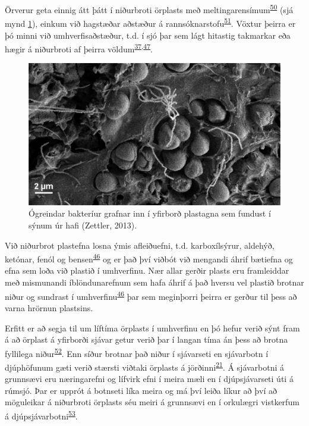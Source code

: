 \documentclass[icelandic,]{book}
\begin{document}
Örverur geta einnig átt þátt í niðurbroti örplasts með meltingarensímum\textsuperscript{\protect\hyperlink{ref-shah2008biological}{50}} (sjá mynd \ref{fig:Plastpit}), einkum við hagstæðar aðstæður á rannsóknarstofu\textsuperscript{\protect\hyperlink{ref-pacco2017biodegradation}{51}}. Vöxtur þeirra er þó minni við umhverfisaðstæður, t.d. í sjó þar sem lágt hitastig takmarkar eða hægir á niðurbroti af þeirra völdum\textsuperscript{\protect\hyperlink{ref-andrady2011microplastics}{37},\protect\hyperlink{ref-barnes2009accumulation}{47}}.

\begin{figure}[H]

{\centering \includegraphics[width=0.8\linewidth]{myndir/Plast_pit} 

}

\caption{Ógreindar bakteríur grafnar inn í yfirborð plastagna sem fundust í sýnum úr hafi (Zettler, 2013).}\label{fig:Plastpit}
\end{figure}

Við niðurbrot plastefna losna ýmis afleiðuefni, t.d. karboxílsýrur, aldehýð, ketónar, fenól og bensen\textsuperscript{\protect\hyperlink{ref-gewert2015pathways}{46}} og er það því viðbót við mengandi áhrif bætiefna og efna sem loða við plastið í umhverfinu.
Nær allar gerðir plasts eru framleiddar með mismunandi íblöndunarefnum sem hafa áhrif á það hversu vel plastið brotnar niður og sundrast í umhverfinu\textsuperscript{\protect\hyperlink{ref-gewert2015pathways}{46}} þar sem meginþorri þeirra er gerður til þess að varna hrörnun plastsins.

Erfitt er að segja til um líftíma örplasts í umhverfinu en þó hefur verið sýnt fram á að örplast á yfirborði sjávar getur verið þar í langan tíma án þess að brotna fyllilega niður\textsuperscript{\protect\hyperlink{ref-brandon2016long}{52}}. Enn síður brotnar það niður í sjávarseti en sjávarbotn í djúphöfunum gæti verið stærsti viðtaki örplasts á jörðinni\textsuperscript{\protect\hyperlink{ref-woodall2014deep}{21}}. Á sjávarbotni á grunnsævi eru næringarefni og lífvirk efni í meira mæli en í djúpsjávarseti úti á rúmsjó. Þar er upprót á botnseti líka meira og má því leiða líkur að því að möguleikar á niðurbroti örplasts séu meiri á grunnsævi en í orkulægri vistkerfum á djúpsjávarbotni\textsuperscript{\protect\hyperlink{ref-Nozari2016}{53}}.
\end{document}
